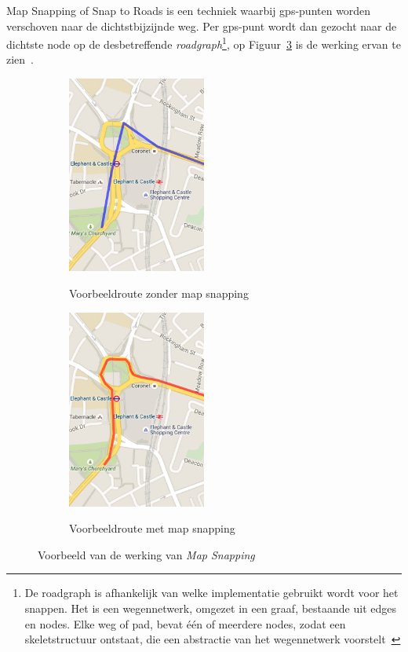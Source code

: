Map Snapping of Snap to Roads is een techniek waarbij \ac{gps}-punten worden
verschoven naar de dichtstbijzijnde weg. Per \ac{gps}-punt wordt dan gezocht
naar de dichtste node op de desbetreffende \textit{roadgraph}\footnote{De
    roadgraph is afhankelijk van welke implementatie gebruikt wordt voor het
    snappen. Het is een wegennetwerk, omgezet in een graaf, bestaande uit edges en
    nodes. Elke weg of pad, bevat één of meerdere nodes, zodat een skeletstructuur
    ontstaat, die een abstractie van het wegennetwerk
    voorstelt~\cite{seiler2022haul}}, op Figuur~\ref{fig:MapSnapping} is de werking
ervan te zien~\cite{Snapping96:online}.
\begin{figure}[h]
    \centering
    \begin{subfigure}[b]{.5\textwidth}
        \centering
        \caption{Voorbeeldroute zonder map snapping}
        \includegraphics[width=0.5\textwidth]{fig/Map Snapping/before.png}\label{fig:before_MapSnapping}
    \end{subfigure}\hfill
    \begin{subfigure}[b]{.5\textwidth}
        \centering
        \caption{Voorbeeldroute met map snapping}
        \includegraphics[width=0.5\textwidth]{fig/Map Snapping/after.png}\label{fig:after_MapSnapping}
    \end{subfigure}
    \caption{Voorbeeld van de werking van \textit{Map Snapping}}\label{fig:MapSnapping}
\end{figure}

